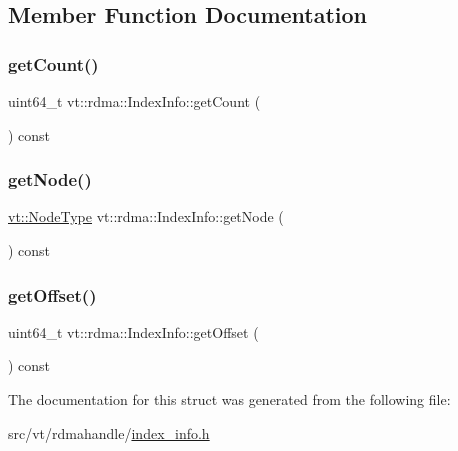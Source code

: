 \subsection{Member Function Documentation}
\mbox{\label{structvt_1_1rdma_1_1_index_info_ae93f18d7a207ba517af6f7cd06a938bb}} 
\subsubsection{\texorpdfstring{get\+Count()}{getCount()}}
{\footnotesize\ttfamily uint64\+\_\+t vt\+::rdma\+::\+Index\+Info\+::get\+Count (\begin{DoxyParamCaption}{ }\end{DoxyParamCaption}) const\hspace{0.3cm}{\ttfamily [inline]}}

\mbox{\label{structvt_1_1rdma_1_1_index_info_a94944747d01e14bb229837b048067c4f}} 
\subsubsection{\texorpdfstring{get\+Node()}{getNode()}}
{\footnotesize\ttfamily \hyperlink{namespacevt_a866da9d0efc19c0a1ce79e9e492f47e2}{vt\+::\+Node\+Type} vt\+::rdma\+::\+Index\+Info\+::get\+Node (\begin{DoxyParamCaption}{ }\end{DoxyParamCaption}) const\hspace{0.3cm}{\ttfamily [inline]}}

\mbox{\label{structvt_1_1rdma_1_1_index_info_ad69b51477f01c99fe3b636ba49477138}} 
\subsubsection{\texorpdfstring{get\+Offset()}{getOffset()}}
{\footnotesize\ttfamily uint64\+\_\+t vt\+::rdma\+::\+Index\+Info\+::get\+Offset (\begin{DoxyParamCaption}{ }\end{DoxyParamCaption}) const\hspace{0.3cm}{\ttfamily [inline]}}



The documentation for this struct was generated from the following file\+:\begin{DoxyCompactItemize}
\item 
src/vt/rdmahandle/\hyperlink{index__info_8h}{index\+\_\+info.\+h}\end{DoxyCompactItemize}
